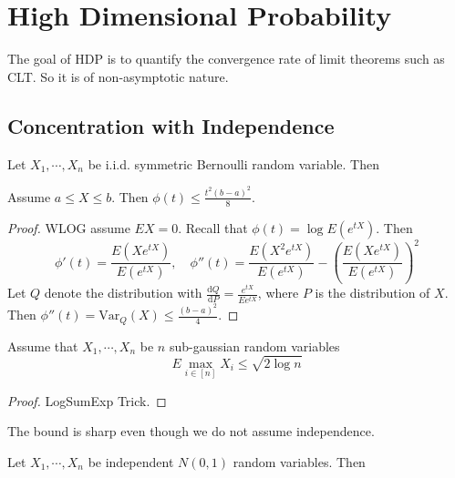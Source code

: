 \chapter{High Dimensional Probability}
The goal of HDP is to quantify the convergence rate of limit theorems such as CLT. So it is of non-asymptotic nature.
\section{Concentration with Independence}
\begin{theorem}
    Let $X_1,\cdots,X_n$ be i.i.d. symmetric Bernoulli random variable. Then 
\end{theorem}

\begin{definition}
    
\end{definition}


\begin{definition}
    
\end{definition}


\begin{lemma}
    Assume $a\le X\le b$. Then $\phi(t)\le \frac{t^2(b-a)^2}{8}$.
\end{lemma}
\begin{proof}
    WLOG assume $EX=0$. Recall that $\phi(t)=\log E(e^{tX})$. Then 
    \[\phi'(t)=\frac{E(Xe^{tX})}{E(e^{tX})},\quad \phi''(t)=\frac{E(X^2e^{tX})}{E(e^{tX})}-(\frac{E(Xe^{tX})}{E(e^{tX})})^2\]
    Let $Q$ denote the distribution with $\frac{\mathrm{d} Q}{\mathrm{d} P} = \frac{e^{tX}}{Ee^{tX}} $, where $P$ is the distribution of $X$.
    Then $\phi''(t)=\text{Var}_Q(X)\le \frac{(b-a)^2}{4}$.
\end{proof}

\begin{lemma}
    Assume that $X_1,\cdots,X_n$ be $n$ sub-gaussian random variables
    \[E\max_{i\in[n]}X_i\le \sqrt{2\log n}\]
\end{lemma}
\begin{proof}
    LogSumExp Trick.
\end{proof}
\begin{remark}
    The bound is sharp even though we do not assume independence.
\end{remark}
\begin{example}
    Let $X_1,\cdots,X_n$ be independent $N(0,1)$ random variables. Then 
\end{example}

